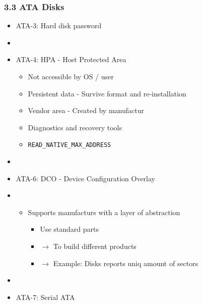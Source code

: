 \begin{frame}[fragile]
  \frametitle{3.3 ATA Disks }
    \begin{itemize}
        \item ATA-3: Hard disk password
	\item[]
        \item ATA-4: HPA - Host Protected Area
        \begin{itemize}
            \item Not accessible by OS / user
            \item Persistent data - Survive format and re-installation
            \item Vendor area - Created by manufactur
            \item Diagnostics and recovery tools
            \item \texttt{READ\_NATIVE\_MAX\_ADDRESS}
        \end{itemize}
	\item[]
        \item ATA-6: DCO - Device Configuration Overlay
	\item[]
        \begin{itemize}
            \item Supports manufacturs with a layer of abstraction
              \begin{itemize}
                \item Use standard parts
		\item[] $\to$ To build different products
		\item[] $\to$ Example: Disks reports uniq amount of sectors
              \end{itemize}
        \end{itemize}
	\item[]
        \item ATA-7: Serial ATA
    \end{itemize}
\end{frame}


